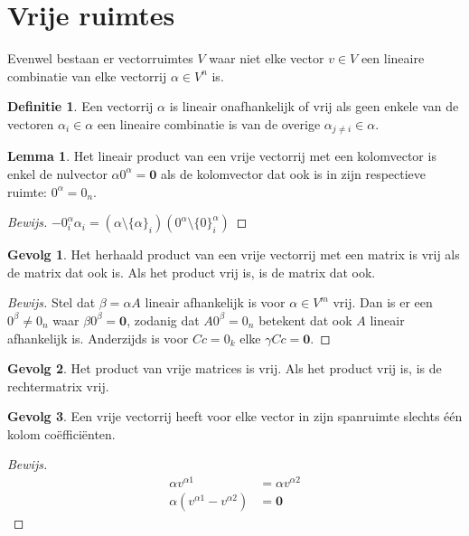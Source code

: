 \documentclass{amsart}
\theoremstyle{definition}
\newtheorem{lmm}{Lemma}[section]
\newtheorem{dfn}{Definitie}[section]
\newtheorem{csq}{Gevolg}[section]
\newenvironment{bewijs}{\begin{proof}[Bewijs]}{\end{proof}}
\newcommand{\zerovec}{\mathbf{0}}
\newcommand{\setsm}[1]{\{#1\}}
\newcommand{\without}[1]{\setminus\setsm#1}
\begin{document}
\section{Vrije ruimtes}

Evenwel bestaan er vectorruimtes $V$ waar niet elke vector $v \in V$ een lineaire combinatie van elke vectorrij $\alpha \in V^n$ is.

\begin{dfn}
	Een vectorrij $\alpha$ is lineair onafhankelijk of vrij als geen enkele van de vectoren $\alpha_i \in \alpha$ een lineaire combinatie is van de overige $\alpha_{j\neq i} \in \alpha$.
\end{dfn}

\begin{lmm}
	Het lineair product van een vrije vectorrij met een kolomvector is enkel de nulvector $\alpha 0^\alpha = \zerovec$ als de kolomvector dat ook is in zijn respectieve ruimte: $0^\alpha = 0_n$.
	\begin{bewijs}
		$-0^\alpha_i \alpha_i = \left(\alpha \without{\alpha_i}\right)\left(0^\alpha \without{0^\alpha_i}\right)$
	\end{bewijs}
\end{lmm}

\begin{csq}
	Het herhaald product van een vrije vectorrij met een matrix is vrij als de matrix dat ook is. Als het product vrij is, is de matrix dat ook.
	\begin{bewijs}
		Stel dat $\beta = \alpha A$ lineair afhankelijk is voor $\alpha \in V^m$ vrij.
		Dan is er een $0^\beta \neq 0_n$ waar $\beta0^\beta = \zerovec$, zodanig dat $A 0^\beta = 0_n$ betekent dat ook $A$ lineair afhankelijk is.
		Anderzijds is voor $Cc = 0_k$ elke $\gamma Cc = \zerovec$.
	\end{bewijs}
\end{csq}

\begin{csq}
	Het product van vrije matrices is vrij. Als het product vrij is, is de rechtermatrix vrij.
\end{csq}

\begin{csq}
	Een vrije vectorrij heeft voor elke vector in zijn spanruimte slechts één kolom coëfficiënten.
	\begin{bewijs}
		\begin{align*}
			\alpha v^{\alpha 1}                  & = \alpha v^{\alpha 2} \\
			\alpha (v^{\alpha 1} - v^{\alpha 2}) & = \zerovec
		\end{align*}
	\end{bewijs}
\end{csq}
\end{document}

